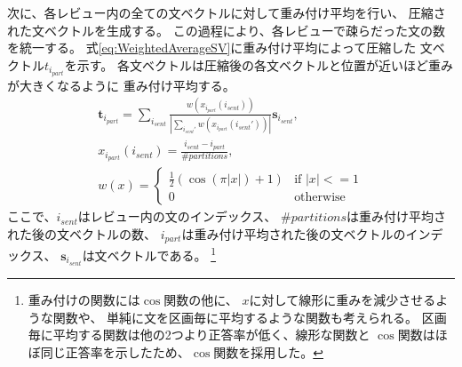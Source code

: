 \documentclass[twocolumn,a4paper]{ltjarticle}
\begin{document}
次に、各レビュー内の全ての文ベクトルに対して重み付け平均を行い、
圧縮された文ベクトルを生成する。
この過程により、各レビューで疎らだった文の数を統一する。
式\ref{eq:WeightedAverageSV}に重み付け平均によって圧縮した
文ベクトル$t_{i_{part}}$を示す。
各文ベクトルは圧縮後の各文ベクトルと位置が近いほど重みが大きくなるように
重み付け平均する。
\begin{gather}
  \mathbf{t}_{i_{part}} = \sum_{i_{sent}}
                          \frac{w(x_{i_{part}}(i_{sent}))}
                               {|\sum_{i_{sent}'} w(x_{i_{part}}(i_{sent}'))|}
                          \mathbf{s}_{i_{sent}},
  \label{eq:WeightedAverageSV} \\
  x_{i_{part}}(i_{sent}) = \frac{i_{sent} - i_{part}}{\#partitions},
  \nonumber \\
  w(x) = \begin{cases}
    \frac{1}{2} (\cos(\pi|x|) + 1) &\text{if $|x| <= 1$} \\
    0 &\text{otherwise}
  \end{cases} \nonumber
\end{gather}
ここで、$i_{sent}$はレビュー内の文のインデックス、
$\#partitions$は重み付け平均された後の文ベクトルの数、
$i_{part}$は重み付け平均された後の文ベクトルのインデックス、
$\mathbf{s}_{i_{sent}}$は文ベクトルである。
\footnote{重み付けの関数には$\cos$関数の他に、
$x$に対して線形に重みを減少させるような関数や、
単純に文を区画毎に平均するような関数も考えられる。
区画毎に平均する関数は他の2つより正答率が低く、線形な関数と
$\cos$関数はほぼ同じ正答率を示したため、$\cos$関数を採用した。}
\end{document}

